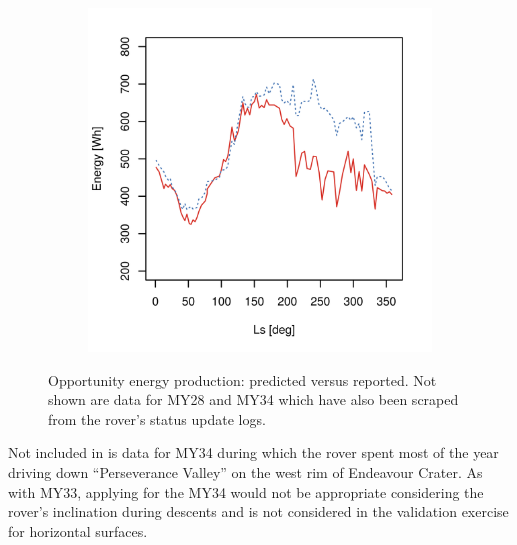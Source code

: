 \begin{figure}[h]
\begin{subfigure}[t]{\subfigureWidth}
  		\label{fig:plot:sub:mer-energy-production-predicted-vs-reported-my32}
  	\end{subfigure}\hfill
	   \begin{subfigure}[t]{\subfigureWidth}
      \centering
  		\includegraphics[height=\graphicsHeight]{sections/mars-solar-energy/photovoltaic-energy/plots/predicted-vs-measured-energy-my33.png}
  		\label{fig:plot:sub:mer-energy-production-predicted-vs-reported-my33}
	   \end{subfigure}\hfill
    \caption[Opportunity energy production: predicted versus reported]
            {Opportunity energy production: predicted versus reported. Not shown are data for \ac{MY}28 and \ac{MY}34 which have also been scraped from the rover's status update logs.}
	\label{fig:plot:mer-energy-production-predicted-vs-reported}
\vspace{-2ex}
\end{figure}

Not included in  is data for \ac{MY}34 during which the rover spent most of the year driving down ``Perseverance Valley'' on the west rim of Endeavour Crater. As with \ac{MY}33, applying  for the \ac{MY}34 would not be appropriate considering the rover's inclination during descents and is not considered in the validation exercise for horizontal surfaces.


